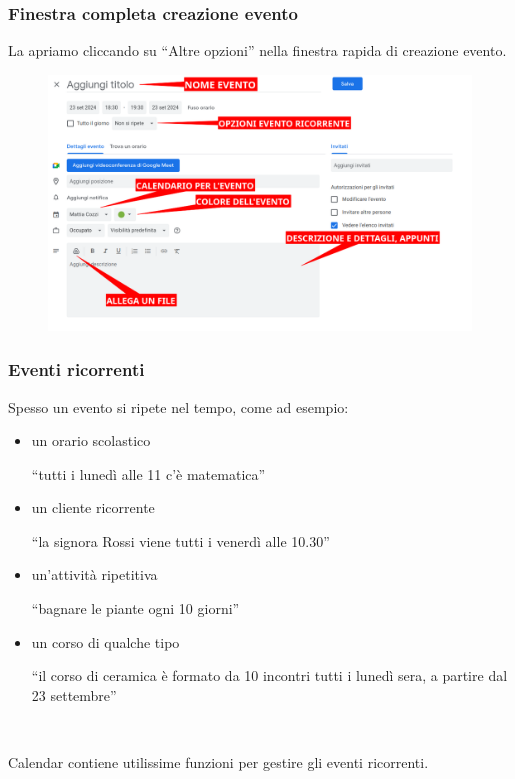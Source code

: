 \documentclass[handout]{beamer}
\begin{document}
\begin{frame}
\frametitle{Finestra completa creazione evento}
La apriamo cliccando su ``Altre opzioni'' nella finestra rapida di creazione evento.

\begin{figure}
  \includegraphics[width=\columnwidth]{img/calendarevento.png}
\end{figure}
\end{frame}

\begin{frame}
\frametitle{Eventi ricorrenti}
Spesso un evento si ripete nel tempo, come ad esempio:
\begin{itemize}
  \item un orario scolastico \begin{center}``tutti i lunedì alle 11 c'è matematica''\end{center}\pause
  \item un cliente ricorrente \begin{center}``la signora Rossi viene tutti i venerdì alle 10.30''\end{center}\pause
  \item un'attività ripetitiva \begin{center}``bagnare le piante ogni 10 giorni''\end{center}\pause
  \item un corso di qualche tipo \begin{center}``il corso di ceramica è  formato da 10 incontri tutti i lunedì sera, a partire dal 23 settembre''\end{center}\pause
\end{itemize}

~

Calendar contiene utilissime funzioni per gestire gli eventi ricorrenti.
\end{frame}
\end{document}
